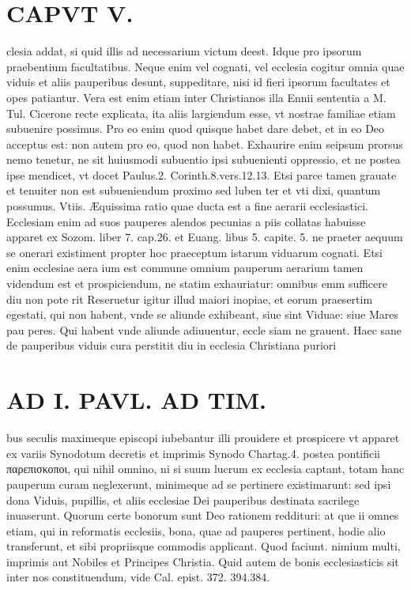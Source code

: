 \documentclass{article}
\begin{document}
\begin{pages}
\section*{CAPVT  V. }
\marginpar{[ p.303 ]}\pstart clesia addat, si quid illis ad necessarium victum deest. Idque pro ipsorum praebentium facultatibus. Neque enim vel cognati, vel ecclesia cogitur omnia quae viduis et aliis pauperibus desunt, suppeditare, nisi id fieri ipsorum facultates et opes patiantur. Vera est enim etiam inter Christianos illa Ennii sententia a M. Tul. Cicerone recte explicata, ita aliis largiendum esse, vt nostrae familiae etiam subuenire possimus. Pro eo enim quod quisque habet dare debet, et in eo Deo acceptus est: non autem pro eo, quod non habet. Exhaurire enim seipsum prorsus nemo tenetur, ne sit huiusmodi subuentio ipsi subuenienti oppressio, et ne postea ipse mendicet, vt docet Paulus.2. Corinth.8.vers.12.13. Etsi parce tamen grauate et tenuiter non est subueniendum proximo sed luben ter et vti dixi, quantum possumus.  \pend\pstart Vtiis. Æquissima ratio quae ducta est a fine aerarii ecclesiastici. Ecclesiam enim ad suos pauperes alendos pecunias a piis collatas habuisse apparet ex Sozom. liber  7. cap.26. et Euang. libus  5. capite. 5. ne praeter aequum se onerari existiment propter hoc praeceptum istarum viduarum cognati. Etsi enim ecclesiae aera ium est commune omnium pauperum aerarium tamen videndum est et prospiciendum, ne statim exhauriatur: omnibus emm sufficere diu non pote rit Reseruetur igitur illud maiori inopiae, et eorum praesertim egestati, qui non habent, vnde se aliunde exhibeant, siue sint Viduae: siue Mares pau peres. Qui habent vnde aliunde adiuuentur, eccle siam ne grauent. Haec sane de pauperibus viduis cura perstitit diu in ecclesia Christiana puriori\pend
\section*{AD I. PAVL. AD TIM. }
\marginpar{[ p.304 ]}\pstart bus seculis maximeque episcopi iubebantur illi prouidere et prospicere vt apparet ex variis Synodotum decretis et imprimis Synodo Chartag.4. postea pontificii παρεπισκοποι, qui nihil omnino, ni si suum lucrum ex ecclesia captant, totam hanc pauperum curam neglexerunt, minimeque ad se pertinere existimarunt: sed ipsi dona Viduis, pupillis, et aliis ecclesiae Dei pauperibus destinata sacrilege inuaserunt. Quorum certe bonorum sunt Deo rationem reddituri: at que ii omnes etiam, qui in reformatis ecclesiis, bona, quae ad pauperes pertinent, hodie alio transferunt, et sibi propriisque commodis applicant. Quod faciunt. nimium multi, imprimis aut Nobiles et Principes Christia. Quid autem de bonis ecclesiasticis sit inter nos constituendum, vide Cal. epist. 372. 394.384.  \pend
{}
{}

\end{pages}
\end{document}
